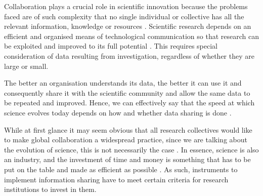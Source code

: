 \label{ref:chapter_1}

Collaboration plays a crucial role in scientific innovation because the problems faced are of such complexity that no single individual or collective has all the relevant information, knowledge or resources \citep{loshin}. Scientific research depends on an efficient and organised means of technological communication so that research can be exploited and improved to its full potential \citep{fair}. This requires special consideration of data resulting from investigation, regardless of whether they are large or small.
  
The better an organisation understands its data, the better it can use it and consequently share it with the scientific community and allow the same data to be repeated and improved. Hence, we can effectively say that the speed at which science evolves today depends on how and whether data sharing is done \citep{10}.

While at first glance it may seem obvious that all research collectives would like to make global collaboration a widespread practice, since we are talking about the evolution of science, this is not necessarily the case \citep{tenopir}. In essence, science is also an industry, and the investment of time and money is something that has to be put on the table and made as efficient as possible \citep{3}. As such, instruments to implement information sharing have to meet certain criteria for research institutions to invest in them.